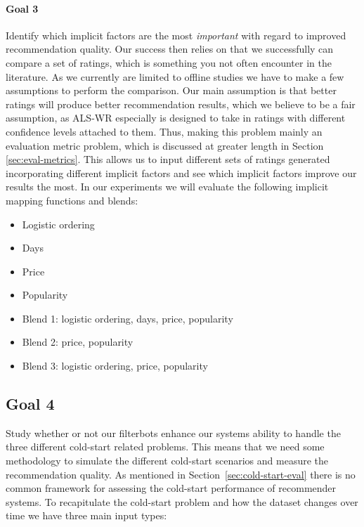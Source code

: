 \paragraph{Goal 3}

Identify which implicit factors are the most \emph{important} with regard to
improved recommendation quality. Our success then relies on that we successfully can compare
a set of ratings, which is something you not often encounter in the literature. As we currently
are limited to offline studies we have to make a few assumptions to perform the comparison.
Our main assumption is that better ratings will produce better recommendation results,
which we believe to be a fair assumption, as ALS-WR especially is designed to take
in ratings with different confidence levels attached to them. Thus, making this
problem mainly an evaluation metric problem, which is discussed at greater
length in Section \ref{sec:eval-metrics}. This allows us to input different sets
of ratings generated incorporating different implicit factors and see which implicit
factors improve our results the most. In our experiments we will evaluate the following
implicit mapping functions and blends:

\begin{itemize}
\item Logistic ordering 
\item Days
\item Price
\item Popularity
\item Blend 1: logistic ordering, days, price, popularity
\item Blend 2: price, popularity
\item Blend 3: logistic ordering, price, popularity
\end{itemize}

\subsection{Goal 4}
\label{cold-start-methodology}

Study whether or not our filterbots enhance our systems ability to handle
the three different cold-start related problems. This means that we need some methodology
to simulate the different cold-start scenarios and measure the recommendation quality.
As mentioned in Section~\ref{sec:cold-start-eval} there is no common framework for assessing 
the cold-start performance of recommender systems. To recapitulate the cold-start problem and how
the dataset changes over time we have three main input types:

